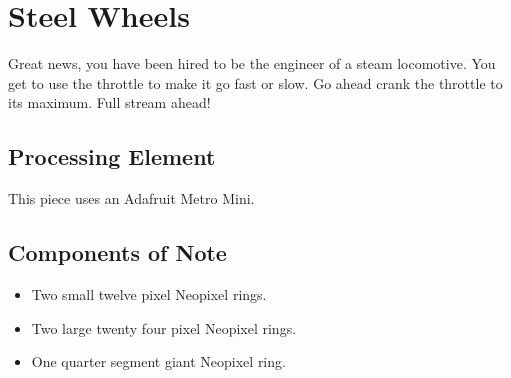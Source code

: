 %
%
%
%
% 
%
%
%
%
%
% 
%

\section{Steel Wheels}

Great news, you have been hired to be the engineer of a steam locomotive. 
You get to use the throttle to make it go fast or slow.  Go ahead crank the 
throttle to its maximum.  Full stream ahead!


\subsection*{Processing Element}

This piece uses an Adafruit Metro Mini.

\subsection*{Components of Note}

\begin{itemize}
\item Two small twelve pixel Neopixel rings.
\item Two large twenty four pixel Neopixel rings.
\item One quarter segment giant Neopixel ring.
\end{itemize}

